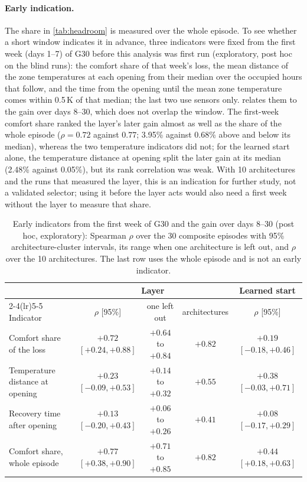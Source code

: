 \paragraph{Early indication.} The share in \cref{tab:headroom} is measured over the whole episode. To see whether a short window
indicates it in advance, three indicators were fixed from the first week (days 1--7) of G30 before this analysis was first run
(exploratory, post hoc on the blind runs): the comfort share of that week's loss, the mean distance of the zone temperatures at
each opening from their median over the occupied hours that follow, and the time from the opening until the mean zone temperature
comes within 0.5\,K of that median; the last two use sensors only.  relates them to the gain over days 8--30,
which does not overlap the window. The first-week comfort share ranked the layer's later gain almost as well as the share of the
whole episode ($\rho = 0.72$ against $0.77$; 3.95\% against 0.68\% above and below its median), whereas
the two temperature indicators did not; for the learned start alone, the temperature distance at opening split the later gain at
its median (2.48\% against 0.05\%), but its rank correlation was weak. With 10 architectures and the runs
that measured the layer, this is an indication for further study, not a validated selector; using it before the layer acts would also need a first
week without the layer to measure that share.
\begin{table}[!htbp]
\centering
\caption{Early indicators from the first week of G30 and the gain over days 8--30 (post hoc, exploratory): Spearman $\rho$ over
the 30 composite episodes with 95\% architecture-cluster intervals, its range when one architecture is left out, and $\rho$ over
the 10 architectures. The last row uses the whole episode and is not an early indicator.}
\label{tab:earlyind}
\footnotesize
\setlength{\tabcolsep}{4pt}
\begin{tabular}{lcccc}
\toprule
 & \multicolumn{3}{c}{Layer} & Learned start\\
\cmidrule(lr){2-4}\cmidrule(lr){5-5}
Indicator & $\rho$ [95\%] & one left out & architectures & $\rho$ [95\%]\\
\midrule
Comfort share of the loss & $+0.72$ $[+0.24, +0.88]$ & $+0.64$ to $+0.84$ & $+0.82$ & $+0.19$ $[-0.18, +0.46]$\\
Temperature distance at opening & $+0.23$ $[-0.09, +0.53]$ & $+0.14$ to $+0.32$ & $+0.55$ & $+0.38$ $[-0.03, +0.71]$\\
Recovery time after opening & $+0.13$ $[-0.20, +0.43]$ & $+0.06$ to $+0.26$ & $+0.41$ & $+0.08$ $[-0.17, +0.29]$\\
\midrule
Comfort share, whole episode & $+0.77$ $[+0.38, +0.90]$ & $+0.71$ to $+0.85$ & $+0.82$ & $+0.44$ $[+0.18, +0.63]$\\
\bottomrule
\end{tabular}
\end{table}

